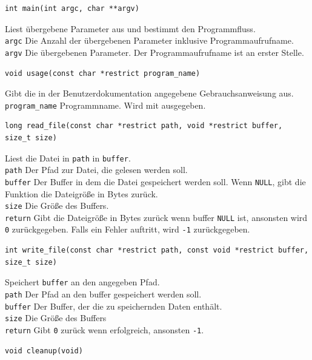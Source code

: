 \documentclass[course=erap]{aspdoc}
\begin{document}
\begin{verbatim}
int main(int argc, char **argv)
\end{verbatim}
Liest übergebene Parameter aus und bestimmt den Programmfluss.\\[1.5mm]
\texttt{argc} Die Anzahl der übergebenen Parameter inklusive Programmaufrufname.\\
\texttt{argv} Die übergebenen Parameter.
Der Programmaufrufname ist an erster Stelle.\\
\begin{verbatim}
void usage(const char *restrict program_name)
\end{verbatim}
Gibt die in der Benutzerdokumentation angegebene Gebrauchsanweisung aus.\\[1.5mm]
\texttt{program\_name} Programmname.
Wird mit ausgegeben.\\
\begin{verbatim}
long read_file(const char *restrict path, void *restrict buffer, size_t size)
\end{verbatim}
Liest die Datei in \texttt{path} in \texttt{buffer}.\\[1.5mm]
\texttt{path} Der Pfad zur Datei, die gelesen werden soll.\\
\texttt{buffer} Der Buffer in dem die Datei gespeichert werden soll.
Wenn \texttt{NULL}, gibt die Funktion die Dateigröße in Bytes zurück.\\
\texttt{size} Die Größe des Buffers.\\
\texttt{return} Gibt die Dateigröße in Bytes zurück wenn buffer \texttt{NULL} ist, ansonsten wird
\texttt{0} zurückgegeben.
Falls ein Fehler auftritt, wird \texttt{-1} zurückgegeben.\\
\begin{verbatim}
int write_file(const char *restrict path, const void *restrict buffer, size_t size)
\end{verbatim}
Speichert \texttt{buffer} an den angegeben Pfad.\\[1.5mm]
\texttt{path} Der Pfad an den buffer gespeichert werden soll.\\
\texttt{buffer} Der Buffer, der die zu speichernden Daten enthält.\\
\texttt{size} Die Größe des Buffers\\
\texttt{return} Gibt \texttt{0} zurück wenn erfolgreich, ansonsten \texttt{-1}.\\
\begin{verbatim}
void cleanup(void)
\end{verbatim}
\end{document}
